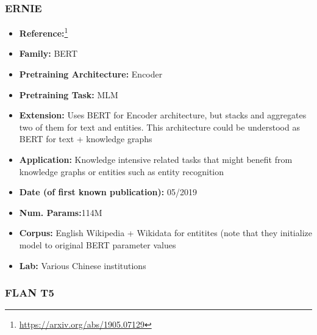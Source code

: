 \documentclass{article}
\begin{document}
\subsubsection{ERNIE}

            \begin{itemize}
                \item \textbf{Reference:}\footnote{\url{https://arxiv.org/abs/1905.07129}}\cite{zhang2019ernie}
                \item \textbf{Family:} BERT 
                \item \textbf{Pretraining Architecture:} Encoder
                \item \textbf{Pretraining Task:} MLM
                \item \textbf{Extension:} Uses BERT for Encoder architecture, but stacks and aggregates two of them for text and entities. This architecture could be understood as BERT for text + knowledge graphs  
                \item \textbf{Application:} Knowledge intensive related tasks that might benefit from knowledge graphs or entities such as entity recognition
                \item \textbf{Date (of first known publication):} 05/2019
                \item \textbf{Num. Params:}114M
                \item \textbf{Corpus:} English Wikipedia + Wikidata for entitites (note that they initialize model to original BERT parameter values
                \item \textbf{Lab:} Various Chinese institutions
            \end{itemize} 

\subsubsection{FLAN T5}
\end{document}
